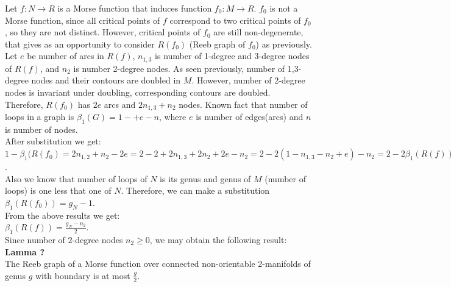 \documentclass[]{article}
\begin{document}
Let $f: N \rightarrow R$ is a Morse function that induces function $f_0: M \rightarrow R$. $f_0$ is not a Morse function, since all critical points of $f$ correspond to two critical points of $f_0$, so they are not distinct. However, critical points of $f_0$ are still non-degenerate, that gives as an opportunity to consider $R(f_0)$ (Reeb graph of $f_0$) as previously. \\
Let $e$ be number of arcs in $R(f)$, $n_{1,3}$ is number of 1-degree and 3-degree nodes of $R(f)$, and $n_2$ is number 2-degree nodes. As seen previously, number of 1,3-degree nodes and their contours are doubled in $M$. However, number of 2-degree nodes is invariant under doubling, corresponding contours are doubled. \\
Therefore, $R(f_0)$ has $2e$ arcs and $2n_{1,3}+n_2$ nodes. Known fact that number of loops in a graph is $\beta_1 (G)=1-+e-n$, where $e$ is number of edges(arcs) and $n$ is number of nodes. \\
After substitution we get:\\
$1-\beta_1(R(f_0)=2n_{1,2}+n_2-2e=2-2+2n_{1,3}+2n_2+2e-n_2=2-2(1-n_{1,3}-n_2+e)-n_2=2-2\beta_1(R(f))-n_2$. \\
Also we know that number of loops of $N$ is its genus and genus of $M$ (number of loops) is one less that one of $N$. Therefore, we can make a substitution $\beta_1(R(f_0))=g_N-1$. \\
From the above results we get: \\
$\beta_1(R(f))=\frac{g_N-n_2}{2}$.\\
Since number of 2-degree nodes $n_2\geq0 $, we may obtain the following result:\\
\textbf{Lamma ?}\\
The Reeb graph of a Morse function over connected non-orientable 2-manifolds of genus $g$ with boundary is at most $\frac{g}{2}$.\\
\end{document}
